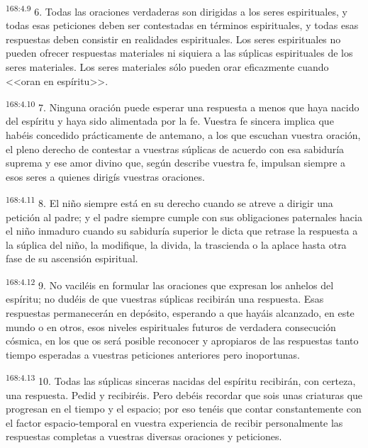 \par 
\textsuperscript{168:4.9} 6. Todas las oraciones verdaderas son dirigidas a los seres espirituales, y todas esas peticiones deben ser contestadas en términos espirituales, y todas esas respuestas deben consistir en realidades espirituales. Los seres espirituales no pueden ofrecer respuestas materiales ni siquiera a las súplicas espirituales de los seres materiales. Los seres materiales sólo pueden orar eficazmente cuando <<oran en espíritu>>.

\par 
\textsuperscript{168:4.10} 7. Ninguna oración puede esperar una respuesta a menos que haya nacido del espíritu y haya sido alimentada por la fe. Vuestra fe sincera implica que habéis concedido prácticamente de antemano, a los que escuchan vuestra oración, el pleno derecho de contestar a vuestras súplicas de acuerdo con esa sabiduría suprema y ese amor divino que, según describe vuestra fe, impulsan siempre a esos seres a quienes dirigís vuestras oraciones.

\par 
\textsuperscript{168:4.11} 8. El niño siempre está en su derecho cuando se atreve a dirigir una petición al padre; y el padre siempre cumple con sus obligaciones paternales hacia el niño inmaduro cuando su sabiduría superior le dicta que retrase la respuesta a la súplica del niño, la modifique, la divida, la trascienda o la aplace hasta otra fase de su ascensión espiritual.

\par 
\textsuperscript{168:4.12} 9. No vaciléis en formular las oraciones que expresan los anhelos del espíritu; no dudéis de que vuestras súplicas recibirán una respuesta. Esas respuestas permanecerán en depósito, esperando a que hayáis alcanzado, en este mundo o en otros, esos niveles espirituales futuros de verdadera consecución cósmica, en los que os será posible reconocer y apropiaros de las respuestas tanto tiempo esperadas a vuestras peticiones anteriores pero inoportunas.

\par 
\textsuperscript{168:4.13} 10. Todas las súplicas sinceras nacidas del espíritu recibirán, con certeza, una respuesta. Pedid y recibiréis. Pero debéis recordar que sois unas criaturas que progresan en el tiempo y el espacio; por eso tenéis que contar constantemente con el factor espacio-temporal en vuestra experiencia de recibir personalmente las respuestas completas a vuestras diversas oraciones y peticiones.

